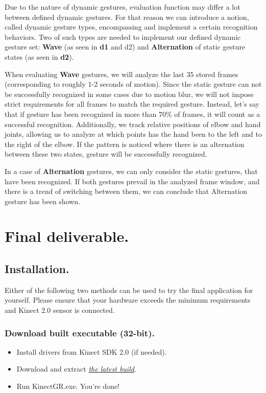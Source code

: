 \documentclass[a4paper,11pt,oneside]{article}
\begin{document}
Due to the nature of dynamic gestures, evaluation function may differ a lot between defined dynamic gestures. For that reason we can introduce a notion, called dynamic gesture types, encompassing and implement a certain recognition behaviors. Two of such types are needed to implement our defined dynamic gesture set: \textbf{Wave} (as seen in \textbf{d1} and {d2}) and \textbf{Alternation} of static gesture states (as seen in \textbf{d2}). 

When evaluating \textbf{Wave} gestures, we will analyze the last 35 stored frames (corresponding to roughly 1-2 seconds of motion). Since the static gesture can not be successfully recognized in some cases due to motion blur, we will not impose strict requirements for all frames to match the required gesture. Instead, let's say that if gesture has been recognized in more than 70\% of frames, it will count as a successful recognition. Additionally, we track relative positions of elbow and hand joints, allowing us to analyze at which points has the hand been to the left and to the right of the elbow. If the pattern is noticed where there is an alternation between these two states, gesture will be successfully recognized.

In a case of \textbf{Alternation} gestures, we can only consider the static gestures, that have been recognized. If both gestures prevail in the analyzed frame window, and there is a trend of switching between them, we can conclude that Alternation gesture has been shown.

\section{Final deliverable.}

\subsection{Installation.}

Either of the following two methods can be used to try the final application for yourself. Please ensure that your hardware exceeds the minimum requirements and Kinect 2.0 sensor is connected.

\subsubsection{Download built executable (32-bit).}

\begin{itemize}
\item Install drivers from Kinect SDK 2.0 (if needed).
\item Download and extract \href{https://github.com/dmitryfd/KinectGR/releases/download/v1.0-demo/KinectGR_v1.0.zip}{\textit{the latest build}}.
\item Run KinectGR.exe. You're done!
\end{itemize}
\end{document}
